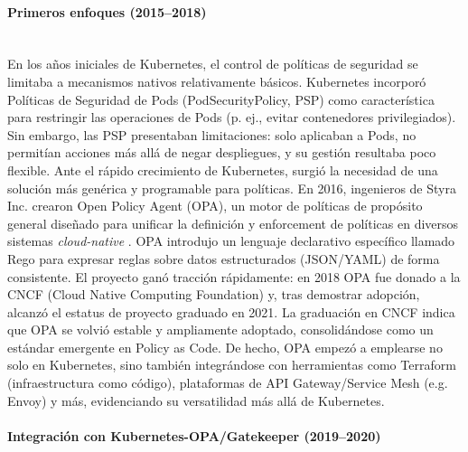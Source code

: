 \documentclass[12pt,twoside,titlepage]{report}
\begin{document}
\paragraph{Primeros enfoques (2015–2018) \\ \\}
En los años iniciales de Kubernetes, el control de políticas de seguridad se limitaba a mecanismos nativos relativamente básicos. Kubernetes incorporó Políticas de Seguridad de Pods (PodSecurityPolicy, PSP) como característica para restringir las operaciones de Pods (p. ej., evitar contenedores privilegiados). Sin embargo, las PSP presentaban limitaciones: solo aplicaban a Pods, no permitían acciones más allá de negar despliegues, y su gestión resultaba poco flexible. Ante el rápido crecimiento de Kubernetes, surgió la necesidad de una solución más genérica y programable para políticas. En 2016, ingenieros de Styra Inc. crearon Open Policy Agent (OPA), un motor de políticas de propósito general diseñado para unificar la definición y enforcement de políticas en diversos sistemas \textit{cloud-native} \cite{castro2024policy}. OPA introdujo un lenguaje declarativo específico llamado Rego para expresar reglas sobre datos estructurados (JSON/YAML) de forma consistente. El proyecto ganó tracción rápidamente: en 2018 OPA fue donado a la CNCF (Cloud Native Computing Foundation) y, tras demostrar adopción, alcanzó el estatus de proyecto graduado en 2021. La graduación en CNCF indica que OPA se volvió estable y ampliamente adoptado, consolidándose como un estándar emergente en Policy as Code. De hecho, OPA empezó a emplearse no solo en Kubernetes, sino también integrándose con herramientas como Terraform (infraestructura como código), plataformas de API Gateway/Service Mesh (e.g. Envoy) y más, evidenciando su versatilidad más allá de Kubernetes.

\paragraph{Integración con Kubernetes-OPA/Gatekeeper (2019–2020) \\ \\}
\end{document}
